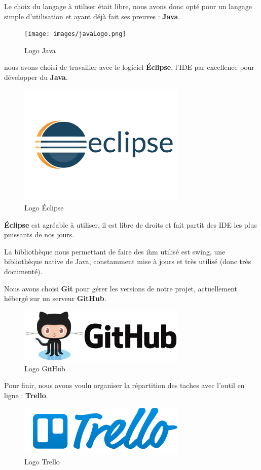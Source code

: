 

Le choix du langage à utiliser était libre, nous avons donc opté pour un langage simple d'utilisation et ayant déjà fait ses preuves : \textbf{Java}.

\begin{figure}[!h]
\centering
\texttt{[image: images/javaLogo.png]}
\caption{Logo Java}
\label{logo_java}
\end{figure}

nous avons choisi de travailler avec le logiciel \textbf{Éclipse}, l'\gls{IDE} par excellence pour développer du \textbf{Java}.

\begin{figure}[H]
\centering
\includegraphics[width=8cm]{images/eclipseLogo.png}
\caption{Logo Éclipse}
\label{logo_eclipse}
\end{figure}

\textbf{Éclipse} est agréable à utiliser, il est libre de droits et fait partit des IDE les plus puissants de nos jours.

La bibliothèque nous permettant de faire des \gls{ihm} utilisé est swing, une bibliothèque native de Java, constamment mise à jours et très utilisé (donc très documenté).

Nous avons choisi \textbf{Git} pour gérer les versions de notre projet, actuellement hébergé sur un serveur \textbf{GitHub}.

\begin{figure}[H]
\centering
\includegraphics[width=8cm]{images/githubLogo.png}
\caption{Logo GitHub}
\label{logo_github}
\end{figure}

Pour finir, nous avons voulu organiser la répartition des taches avec l'outil en ligne : \textbf{Trello}.

\begin{figure}[H]
\centering
\includegraphics[width=8cm]{images/trelloLogo.png}
\caption{Logo Trello}
\label{logo_trello}
\end{figure}